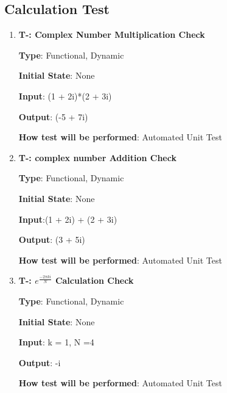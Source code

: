 \documentclass[12pt, titlepage]{article}
\newcounter{tnum}
\begin{document}

\subsection{Calculation Test}

\begin{enumerate}

\item{\textbf{T-\thetnum \label{CCC}: Complex Number Multiplication Check}}

\textbf {Type}: Functional, Dynamic
					
\textbf {Initial State}: None
					
\textbf {Input}: (1 + 2i)*(2 + 3i)
					
\textbf {Output}: (-5 + 7i)
					
\textbf {How test will be performed}: Automated Unit Test

\item{\textbf{T-\thetnum \label{CCA}: complex number Addition Check}}

\textbf {Type}: Functional, Dynamic
					
\textbf {Initial State}: None
					
\textbf {Input}:(1 + 2i) + (2 + 3i)
					
\textbf {Output}: (3 + 5i)
					
\textbf {How test will be performed}:  Automated Unit Test


\item{\textbf{T-\thetnum \label{FZ}: $e^{\frac{-2\pi ki}{N}}$ Calculation Check}}

\textbf {Type}: Functional, Dynamic
					
\textbf {Initial State}: None
					
\textbf {Input}: k = 1, N =4
					
\textbf {Output}: -i
					
\textbf {How test will be performed}:  Automated Unit Test

\end{enumerate}	

\end{document}
